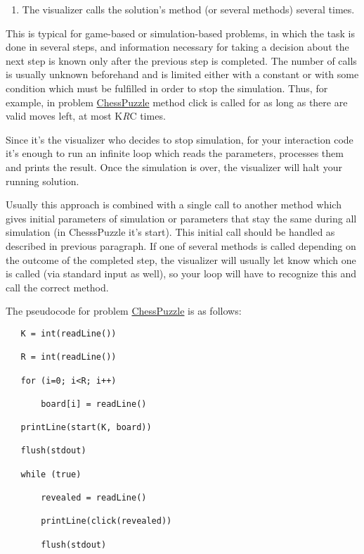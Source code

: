 \begin{enumerate}
\def\labelenumi{\arabic{enumi}.}
\setcounter{enumi}{1}
\tightlist
\item
  The visualizer calls the solution's method (or several methods)
  several times.
\end{enumerate}

This is typical for game-based or simulation-based problems, in which
the task is done in several steps, and information necessary for taking
a decision about the next step is known only after the previous step is
completed. The number of calls is usually unknown beforehand and is
limited either with a constant or with some condition which must be
fulfilled in order to stop the simulation. Thus, for example, in problem
\href{http://www.topcoder.com/longcontest/?module=ViewProblemStatement\&rd=14195\&pm=10728}{ChessPuzzle}
method click is called for as long as there are valid moves left, at
most K\emph{R}C times.

Since it's the visualizer who decides to stop simulation, for your
interaction code it's enough to run an infinite loop which reads the
parameters, processes them and prints the result. Once the simulation is
over, the visualizer will halt your running solution.

Usually this approach is combined with a single call to another method
which gives initial parameters of simulation or parameters that stay the
same during all simulation (in ChesssPuzzle it's start). This initial
call should be handled as described in previous paragraph. If one of
several methods is called depending on the outcome of the completed
step, the visualizer will usually let know which one is called (via
standard input as well), so your loop will have to recognize this and
call the correct method.

The pseudocode for problem
\href{http://www.topcoder.com/longcontest/?module=ViewProblemStatement\&rd=14195\&pm=10728}{ChessPuzzle}
is as follows:

\begin{verbatim}
   K = int(readLine())

   R = int(readLine())

   for (i=0; i<R; i++)

       board[i] = readLine()

   printLine(start(K, board))

   flush(stdout)

   while (true)

       revealed = readLine()

       printLine(click(revealed))

       flush(stdout)
\end{verbatim}

